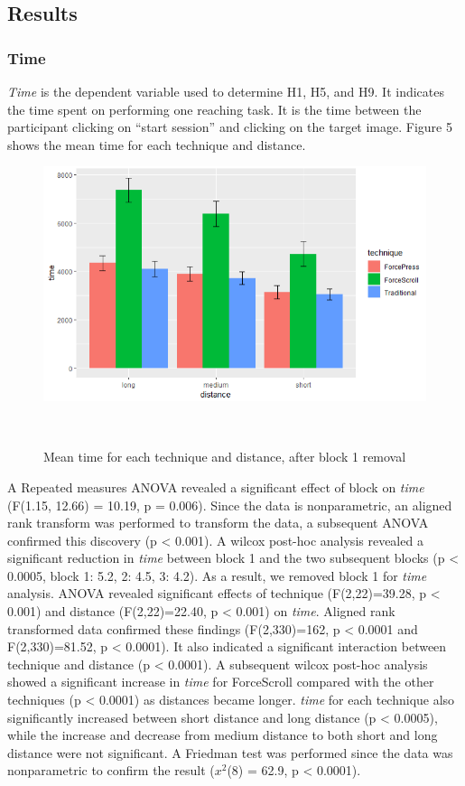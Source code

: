 \documentclass{sigchi}
\begin{document}
\subsection{Results}
\subsubsection{Time}
\textit{Time} is the dependent variable used to determine H1, H5, and H9. It indicates the time spent on performing one reaching task. It is the time between the participant clicking on ``start session'' and clicking on the target image. Figure 5 shows the mean time for each technique and distance.
\begin{figure}[!h]
	\centering
	\includegraphics[width=0.8\columnwidth]{figures/figure4}
	\caption{Mean time for each technique and distance, after block 1 removal}~\label{fig:figure5}
\end{figure}
 
A Repeated measures ANOVA revealed a significant effect of block on \textit{time} (F(1.15, 12.66) = 10.19, p = 0.006). Since the data is nonparametric, an aligned rank transform was performed to transform the data, a subsequent ANOVA confirmed this discovery (p < 0.001). A wilcox post-hoc analysis revealed a significant reduction in \textit{time} between block 1 and the two subsequent blocks (p < 0.0005, block 1: 5.2, 2: 4.5, 3: 4.2). As a result, we removed block 1 for \textit{time} analysis. ANOVA revealed significant effects of technique (F(2,22)=39.28, p < 0.001) and distance (F(2,22)=22.40, p < 0.001) on \textit{time}. Aligned rank transformed data confirmed these findings (F(2,330)=162, p < 0.0001 and F(2,330)=81.52, p < 0.0001). It also indicated a significant interaction between technique and distance (p < 0.0001). A subsequent wilcox post-hoc analysis showed a significant increase in \textit{time} for ForceScroll compared with the other techniques (p < 0.0001) as distances became longer. \textit{time} for each technique also significantly increased between short distance and long distance (p < 0.0005), while the increase and decrease from medium distance to both short and long distance were not significant. A Friedman test was performed since the data was nonparametric to confirm the result ($x^{2}$(8) = 62.9, p < 0.0001).
\end{document}
